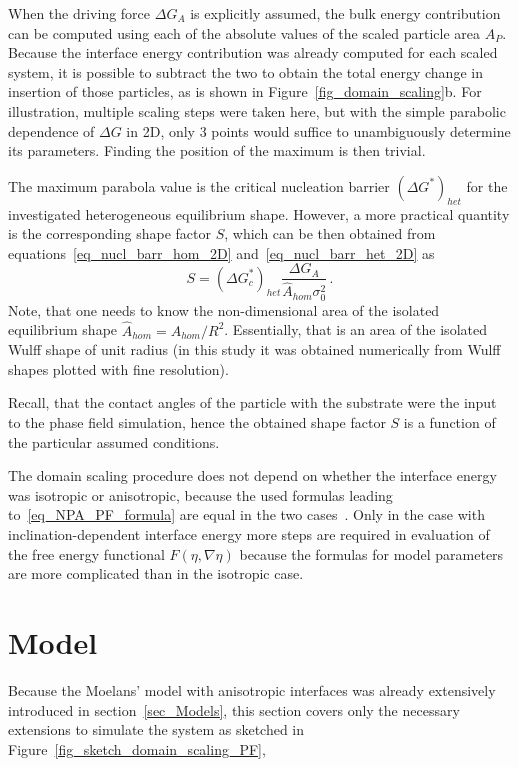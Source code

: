 When the driving force $\Delta G_A$ is explicitly assumed, the bulk energy contribution can be computed using each of the absolute values of the scaled particle area $A_P$. Because the interface energy contribution was already computed for each scaled system, it is possible to subtract the two to obtain the total energy change in insertion of those particles, as is shown in Figure~\ref{fig_domain_scaling}b. For illustration, multiple scaling steps were taken here, but with the simple parabolic dependence of $\Delta G$ in 2D, only 3 points would suffice to unambiguously determine its parameters. Finding the position of the maximum is then trivial. 

The maximum parabola value is the critical nucleation barrier $(\Delta G^*)_{het}$ for the investigated heterogeneous equilibrium shape. However, a more practical quantity is the corresponding shape factor $S$, which can be then obtained from equations~\eqref{eq_nucl_barr_hom_2D} and~\eqref{eq_nucl_barr_het_2D} as
\begin{equation} \label{eq_NPA_PF_formula}
	S = (\Delta G_c^*)_{het}\frac{\Delta G_A}{\hat{A}_{hom}\sigma_0^2} \,.
\end{equation}
Note, that one needs to know the non-dimensional area of the isolated equilibrium shape $\hat{A}_{hom}=A_{hom}/R^2$. Essentially, that is an area of the isolated Wulff shape of unit radius (in this study it was obtained numerically from Wulff shapes plotted with fine resolution).

Recall, that the contact angles of the particle with the substrate were the input to the phase field simulation, hence the obtained shape factor $S$ is a function of the particular assumed conditions. 

The domain scaling procedure does not depend on whether the interface energy was isotropic or anisotropic, because the used formulas leading to~\eqref{eq_NPA_PF_formula} are equal in the two cases~\cite{Mariaux2011}. Only in the case with inclination-dependent interface energy more steps are required in evaluation of the free energy functional $F(\eta,\nabla\eta)$ because the formulas for model parameters are more complicated than in the isotropic case.

\section{Model}
Because the Moelans' model with anisotropic interfaces was already extensively introduced in section~\ref{sec_Models}, this section covers only the necessary extensions to simulate the system as sketched in Figure~\ref{fig_sketch_domain_scaling_PF}, 

